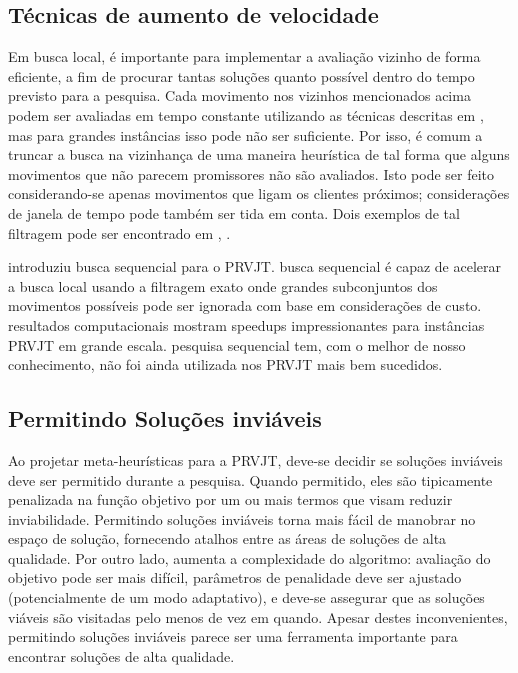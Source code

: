  
 \subsection{Técnicas de aumento de velocidade}
 
 Em busca local, é importante para implementar a avaliação vizinho de forma eficiente, a fim de procurar tantas soluções quanto possível dentro do tempo previsto para a pesquisa. Cada movimento nos vizinhos mencionados acima podem ser avaliadas em tempo constante utilizando as técnicas descritas em \cite{kindervater97}, mas para grandes instâncias isso pode não ser suficiente. Por isso, é comum a truncar a busca na vizinhança de uma maneira heurística de tal forma que alguns movimentos que não parecem promissores não são avaliados. Isto pode ser feito considerando-se apenas movimentos que ligam os clientes próximos; considerações de janela de tempo pode também ser tida em conta. Dois exemplos de tal filtragem pode ser encontrado em \cite{uno00} , \cite{nagata10}.
 
 \cite{daniel14} introduziu busca sequencial para o PRVJT. busca sequencial é capaz de acelerar a busca local usando a filtragem exato onde grandes subconjuntos dos movimentos possíveis pode ser ignorada com base em considerações de custo. resultados computacionais mostram speedups impressionantes para instâncias PRVJT em grande escala. pesquisa sequencial tem, com o melhor de nosso conhecimento, não foi ainda utilizada nos PRVJT mais bem sucedidos.
 
 
 \subsection{Permitindo Soluções inviáveis}
 
Ao projetar meta-heurísticas para a PRVJT, deve-se decidir se soluções inviáveis deve ser permitido durante a pesquisa. Quando permitido, eles são tipicamente penalizada na função objetivo por um ou mais termos que visam reduzir inviabilidade. Permitindo soluções inviáveis torna mais fácil de manobrar no espaço de solução, fornecendo atalhos entre as áreas de soluções de alta qualidade. Por outro lado, aumenta a complexidade do algoritmo: avaliação do objetivo pode ser mais difícil, parâmetros de penalidade deve ser ajustado (potencialmente de um modo adaptativo), e deve-se assegurar que as soluções viáveis são visitadas pelo menos de vez em quando. Apesar destes inconvenientes, permitindo soluções inviáveis parece ser uma ferramenta importante para encontrar soluções de alta qualidade.
 
